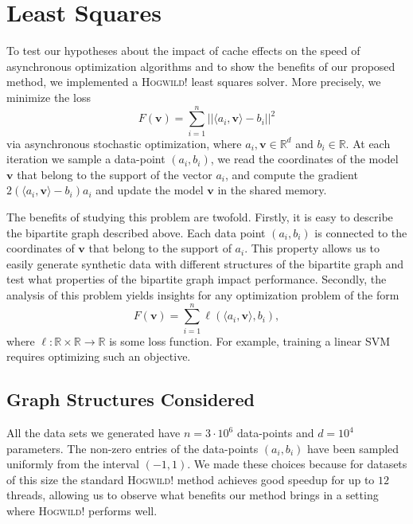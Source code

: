 \documentclass[times,11pt]{article}
\numberwithin{equation}{section}		%
\numberwithin{figure}{section}			%
\numberwithin{table}{section}				%
\newcommand{\ltwonorm}[1]{\left|\left|{#1}\right|\right|}
\newcommand{\xvec}{\mathbf{v}}
\newcommand{\HW}{\textsc{Hogwild!}}
\newcommand{\RR}{\mathbb{R}}
\begin{document}
\section{Least Squares}\label{sec:ls}

To test our hypotheses about the impact of cache effects on the speed of asynchronous optimization algorithms and to show the benefits of our proposed method, we implemented a \HW{} least squares solver. More precisely, we minimize the loss 
\begin{equation}
\label{eq:LS}
F(\xvec) = \sum_{i = 1}^n \ltwonorm{\langle a_i, \xvec \rangle - b_i}^2
\end{equation}
via asynchronous stochastic optimization, where $a_i, \xvec \in \RR^d$ and $b_i\in \RR$. 
At each iteration we sample a data-point $(a_i, b_i)$, we read the coordinates of the model $\xvec$ that belong to the support of the vector $a_i$, and compute the gradient $2(\langle a_i, \xvec\rangle - b_i)a_i$ and update the model $\xvec$ in the shared memory.

The benefits of studying this problem are twofold. Firstly, it is easy to describe the bipartite graph described above. Each data point $(a_i,b_i)$ is connected to the coordinates of $\xvec$ that belong to the support of $a_i$. This property allows us to easily generate synthetic data with different structures of the bipartite graph and test what properties of the bipartite graph impact performance. Secondly, the analysis of this problem yields insights for any optimization problem of the form 
\begin{equation}
F(\xvec) = \sum_{i = 1}^n \ell (\langle a_i, \xvec\rangle, b_i),
\end{equation}
where $\ell \colon \RR \times \RR \rightarrow \RR$ is some loss function. For example, training a linear SVM requires optimizing such an objective. 


\subsection{Graph Structures Considered}

All the data sets we generated have $n = 3\cdot 10^6$ data-points and $d = 10^4$ parameters. The non-zero entries of the data-points $(a_i, b_i)$ have been sampled uniformly from the interval $(-1,1)$.  We made these choices because for datasets of this size the standard \HW{} method achieves good speedup for up to $12$ threads, allowing us to observe what benefits our method brings in a setting where \HW{} performs well. 
\end{document}
